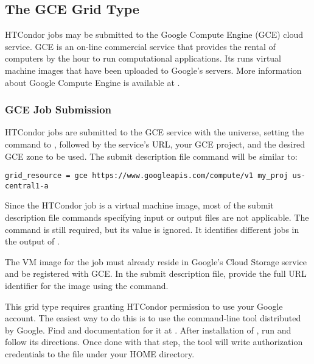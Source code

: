\subsection{\label{sec:Gce}The GCE Grid Type }

HTCondor jobs may be submitted to the Google Compute Engine (GCE)
cloud service.
GCE is an on-line commercial service that provides
the rental of computers by the hour to run computational applications.
Its runs virtual machine images that have been uploaded to Google's
servers.
More information about Google Compute Engine is available at
.

\subsubsection{\label{sec:Gce-submit}GCE Job Submission}

HTCondor jobs are submitted to the GCE service
with the  universe, setting the
 command to , followed 
by the service's URL, your GCE project, 
and the desired GCE zone to be used.
The submit description file command will be similar to:
\begin{verbatim}
grid_resource = gce https://www.googleapis.com/compute/v1 my_proj us-central1-a
\end{verbatim}

Since the HTCondor job is a virtual machine image,
most of the submit description file commands
specifying input or output files are not applicable.
The  command is still required,
but its value is ignored. 
It identifies different jobs in the output of .

The VM image for the job must already reside in Google's Cloud Storage
service and be registered with GCE.
In the submit description file,
provide the full URL identifier for the image using 
the  command.

This grid type requires granting HTCondor permission to use your
Google account. 
The easiest way to do this is to use the 
command-line tool distributed by Google.
Find  and documentation for it at
.
After installation of , 
run  and follow its directions.
Once done with that step,
the tool will write authorization credentials to the
file  under your HOME directory.

